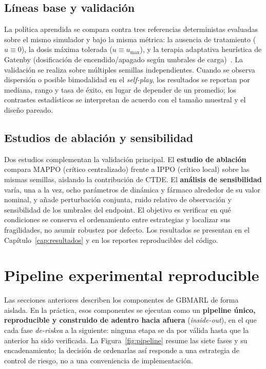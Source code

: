 \subsection{Líneas base y validación}

La política aprendida se compara contra tres referencias deterministas evaluadas sobre el mismo simulador y bajo la misma métrica: la ausencia de tratamiento ($u \equiv 0$), la dosis máxima tolerada ($u \equiv u_{\max}$), y la terapia adaptativa heurística de Gatenby (dosificación de encendido/apagado según umbrales de carga)~\cite{Gallaher2017,Stankova2019}. La validación se realiza sobre múltiples semillas independientes. Cuando se observa dispersión o posible bimodalidad en el \emph{self-play}, los resultados se reportan por mediana, rango y tasa de éxito, en lugar de depender de un promedio; los contrastes estadísticos se interpretan de acuerdo con el tamaño muestral y el diseño pareado.

\subsection{Estudios de ablación y sensibilidad}

Dos estudios complementan la validación principal. El \textbf{estudio de ablación} compara MAPPO (crítico centralizado) frente a IPPO (crítico local) sobre las mismas semillas, aislando la contribución de CTDE. El \textbf{análisis de sensibilidad} varía, una a la vez, ocho parámetros de dinámica y fármaco alrededor de su valor nominal, y añade perturbación conjunta, ruido relativo de observación y sensibilidad de los umbrales del endpoint. El objetivo es verificar en qué condiciones se conserva el ordenamiento entre estrategias y localizar sus fragilidades, no asumir robustez por defecto. Los resultados se presentan en el Capítulo~\ref{cap:resultados} y en los reportes reproducibles del código.

\section{Pipeline experimental reproducible}
\label{sec:pipeline}

Las secciones anteriores describen los componentes de GBMARL de forma aislada. En la práctica, esos componentes se ejecutan como un \textbf{pipeline único, reproducible y construido de adentro hacia afuera} (\emph{inside-out}), en el que cada fase \emph{de-riskea} a la siguiente: ninguna etapa se da por válida hasta que la anterior ha sido verificada. La Figura~\ref{fig:pipeline} resume las siete fases y su encadenamiento; la decisión de ordenarlas así responde a una estrategia de control de riesgo, no a una conveniencia de implementación.

